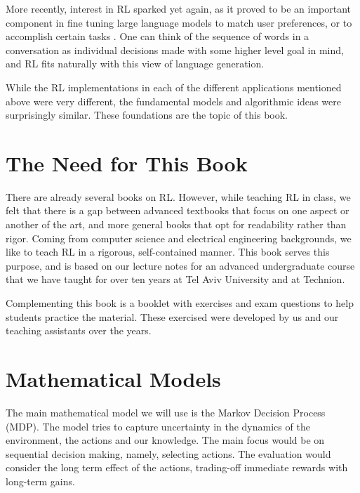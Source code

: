 More recently, interest in RL sparked yet again, as it proved to be an important component in fine tuning large language models to match user preferences, or to accomplish certain tasks \cite{ouyang2022training,zhang2023planning}. One can think of the sequence of words in a conversation as individual decisions made with some higher level goal in mind, and RL fits naturally with this view of language generation.

While the RL implementations in each of the different applications mentioned above were very different, the fundamental models and algorithmic ideas were surprisingly similar. These foundations are the topic of this book.


\section{The Need for This Book}

There are already several books on RL. However, while teaching RL in class, we felt that there is a gap between advanced textbooks that focus on one aspect or another of the art, and more general books that opt for readability rather than rigor. Coming from computer science and electrical engineering backgrounds, we like to teach RL in a rigorous, self-contained manner. This book serves this purpose, and is based on our lecture notes for an advanced undergraduate course that we have taught for over ten years at Tel Aviv University and at Technion.

Complementing this book is a booklet with exercises and exam questions to help students practice the material. These exercised were developed by us and our teaching assistants over the years.

\section{Mathematical Models}
%
The main mathematical model we will use is the Markov Decision Process
(MDP). The model tries to capture uncertainty in the dynamics of the
environment, the actions and our knowledge. The main focus would be
on sequential decision making, namely, selecting actions. The evaluation would
consider the long term effect of the actions, trading-off immediate
rewards with long-term gains.

